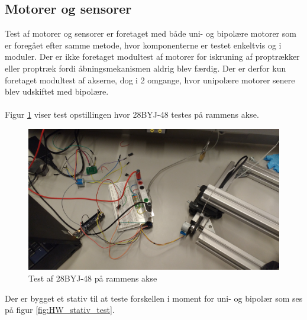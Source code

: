 \subsection{Motorer og sensorer}
Test af motorer og sensorer er foretaget med både uni- og bipolære motorer som er foregået efter samme metode, hvor komponenterne er testet enkeltvis og i moduler. Der er ikke foretaget modultest af motorer for iskruning af proptrækker eller proptræk fordi åbningsmekanismen aldrig blev færdig. Der er derfor kun foretaget modultest af akserne, dog i 2 omgange, hvor unipolære motorer senere blev udskiftet med bipolære.
\\
\\
Figur \ref{fig:HW_bipolar_akse} viser test opstillingen hvor 28BYJ-48 testes på rammens akse.

\begin{figure}[H]
	\includegraphics[scale=0.09]{tex/Test/Motor-sensor/Bipolar_test_opstilling.jpg}
	\caption{Test af 28BYJ-48 på rammens akse}
	\label{fig:HW_bipolar_akse}
\end{figure}

\noindent
Der er bygget et stativ til at teste forskellen i moment for uni- og bipolær som ses på figur \ref{fig:HW_stativ_test}.

